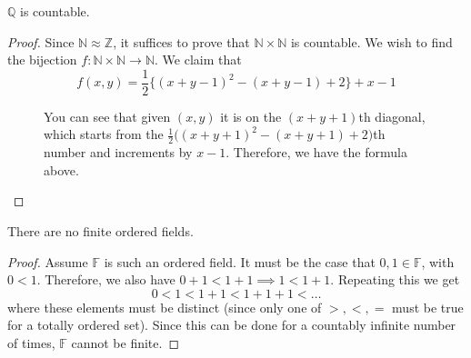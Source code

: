   \begin{theorem}
    $\mathbb{Q}$ is countable. 
  \end{theorem}
  \begin{proof}
    Since $\mathbb{N} \approx \mathbb{Z}$, it suffices to prove that $\mathbb{N} \times \mathbb{N}$ is countable. We wish to find the bijection $f: \mathbb{N} \times \mathbb{N} \rightarrow \mathbb{N}$. We claim that 
    \begin{equation}
      f(x, y) = \frac{1}{2} \big\{ (x + y - 1)^2 - (x + y - 1) + 2 \big\} + x - 1
    \end{equation}
    \begin{figure}[H]
      \centering 
      \caption{You can see that given $(x, y)$ it is on the $(x+y+1)$th diagonal, which starts from the $\frac{1}{2} \big((x+y+1)^2 - (x+y+1) + 2)$th number and increments by $x-1$. Therefore, we have the formula above. } 
      \label{fig:rationals_countable}
    \end{figure}
  \end{proof}

  \begin{theorem}
    There are no finite ordered fields. 
  \end{theorem} 
  \begin{proof}
    Assume $\mathbb{F}$ is such an ordered field. It must be the case that $0, 1 \in \mathbb{F}$, with $0 < 1$. Therefore, we also have $0 + 1 < 1 + 1 \implies 1 < 1 + 1$. Repeating this we get 
    \begin{equation}
      0 < 1 < 1 + 1 < 1 + 1 + 1 < \ldots
    \end{equation}
    where these elements must be distinct (since only one of $>, <, =$ must be true for a totally ordered set). Since this can be done for a countably infinite number of times, $\mathbb{F}$ cannot be finite. 
  \end{proof}

